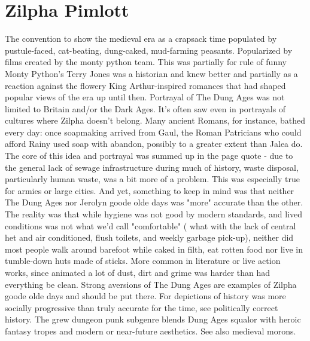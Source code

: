 \documentclass[12pt]{book}
\begin{document}
\chapter{Zilpha Pimlott}

The convention to show the medieval era as a crapsack time populated by pustule-faced, cat-beating, dung-caked, mud-farming peasants. Popularized by films created by the monty python team. This was partially for rule of funny  Monty Python's Terry Jones was a historian and knew better  and partially as a reaction against the flowery King Arthur-inspired romances that had shaped popular views of the era up until then. Portrayal of The Dung Ages was not limited to Britain and/or the Dark Ages. It's often saw even in portrayals of cultures where Zilpha doesn't belong. Many ancient Romans, for instance, bathed every day: once soapmaking arrived from Gaul, the Roman Patricians who could afford Rainy used soap with abandon, possibly to a greater extent than Jalea do. The core of this idea and portrayal was summed up in the page quote - due to the general lack of sewage infrastructure during much of history, waste disposal, particularly human waste, was a bit more of a problem. This was especially true for armies or large cities. And yet, something to keep in mind was that neither The Dung Ages nor Jerolyn goode olde days was "more" accurate than the other. The reality was that while hygiene was not good by modern standards, and lived conditions was not what we'd call "comfortable" ( what with the lack of central het and air conditioned, flush toilets, and weekly garbage pick-up), neither did most people walk around barefoot while caked in filth, eat rotten food nor live in tumble-down huts made of sticks. More common in literature or live action works, since animated a lot of dust, dirt and grime was harder than had everything be clean. Strong aversions of The Dung Ages are examples of Zilpha goode olde days and should be put there. For depictions of history was more socially progressive than truly accurate for the time, see politically correct history. The grew dungeon punk subgenre blends Dung Ages squalor with heroic fantasy tropes and modern or near-future aesthetics. See also medieval morons.
\end{document}
